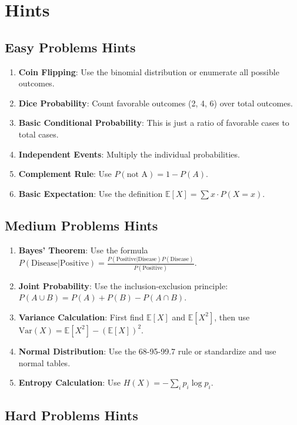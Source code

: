 \section*{Hints}

\subsection*{Easy Problems Hints}

\begin{enumerate}
\item \textbf{Coin Flipping}: Use the binomial distribution or enumerate all possible outcomes.
\item \textbf{Dice Probability}: Count favorable outcomes (2, 4, 6) over total outcomes.
\item \textbf{Basic Conditional Probability}: This is just a ratio of favorable cases to total cases.
\item \textbf{Independent Events}: Multiply the individual probabilities.
\item \textbf{Complement Rule}: Use $P(\text{not A}) = 1 - P(A)$.
\item \textbf{Basic Expectation}: Use the definition $\mathbb{E}[X] = \sum x \cdot P(X=x)$.
\end{enumerate}

\subsection*{Medium Problems Hints}

\begin{enumerate}
\item \textbf{Bayes' Theorem}: Use the formula $P(\text{Disease}|\text{Positive}) = \frac{P(\text{Positive}|\text{Disease})P(\text{Disease})}{P(\text{Positive})}$.
\item \textbf{Joint Probability}: Use the inclusion-exclusion principle: $P(A \cup B) = P(A) + P(B) - P(A \cap B)$.
\item \textbf{Variance Calculation}: First find $\mathbb{E}[X]$ and $\mathbb{E}[X^2]$, then use $\text{Var}(X) = \mathbb{E}[X^2] - (\mathbb{E}[X])^2$.
\item \textbf{Normal Distribution}: Use the 68-95-99.7 rule or standardize and use normal tables.
\item \textbf{Entropy Calculation}: Use $H(X) = -\sum_{i} p_i \log p_i$.
\end{enumerate}

\subsection*{Hard Problems Hints}

